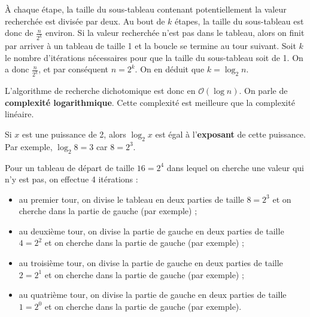 \documentclass[
  a4paper,
  DIV=11,
  numbers=noendperiod]{scrartcl}
\providecommand{\tightlist}{%
  \setlength{\itemsep}{0pt}\setlength{\parskip}{0pt}}\usepackage{longtable,booktabs,array}
\begin{document}
À chaque étape, la taille du sous-tableau contenant potentiellement la
valeur recherchée est divisée par deux. Au bout de \(k\) étapes, la
taille du sous-tableau est donc de \(\frac{n}{2^k}\) environ. Si la
valeur recherchée n'est pas dans le tableau, alors on finit par arriver
à un tableau de taille 1 et la boucle se termine au tour suivant. Soit
\(k\) le nombre d'itérations nécessaires pour que la taille du
sous-tableau soit de 1. On a donc \(\frac{n}{2^k}\), et par conséquent
\(n=2^k\). On en déduit que \(k=\log_2 n\).

L'algorithme de recherche dichotomique est donc en
\(\mathcal{O}(\log n)\). On parle de \textbf{complexité logarithmique}.
Cette complexité est meilleure que la complexité linéaire.

\begin{tcolorbox}[enhanced jigsaw, colback=white, left=2mm, toptitle=1mm, title=\textcolor{quarto-callout-note-color}{\faInfo}\hspace{0.5em}{Notion de logarithme de base 2}, opacityback=0, arc=.35mm, titlerule=0mm, leftrule=.75mm, bottomtitle=1mm, toprule=.15mm, opacitybacktitle=0.6, bottomrule=.15mm, rightrule=.15mm, coltitle=black, colbacktitle=quarto-callout-note-color!10!white, breakable, colframe=quarto-callout-note-color-frame]

Si \(x\) est une puissance de 2, alors \(\log_2 x\) est égal à
l'\textbf{exposant} de cette puissance. Par exemple, \(\log_2 8 = 3\)
car \(8 = 2^3\).

\end{tcolorbox}

Pour un tableau de départ de taille \(16=2^4\) dans lequel on cherche
une valeur qui n'y est pas, on effectue 4 itérations :

\begin{itemize}
\tightlist
\item
  au premier tour, on divise le tableau en deux parties de taille
  \(8=2^3\) et on cherche dans la partie de gauche (par exemple) ;
\item
  au deuxième tour, on divise la partie de gauche en deux parties de
  taille \(4=2^2\) et on cherche dans la partie de gauche (par exemple)
  ;
\item
  au troisième tour, on divise la partie de gauche en deux parties de
  taille \(2=2^1\) et on cherche dans la partie de gauche (par exemple)
  ;
\item
  au quatrième tour, on divise la partie de gauche en deux parties de
  taille \(1=2^0\) et on cherche dans la partie de gauche (par exemple).
\end{itemize}
\end{document}
